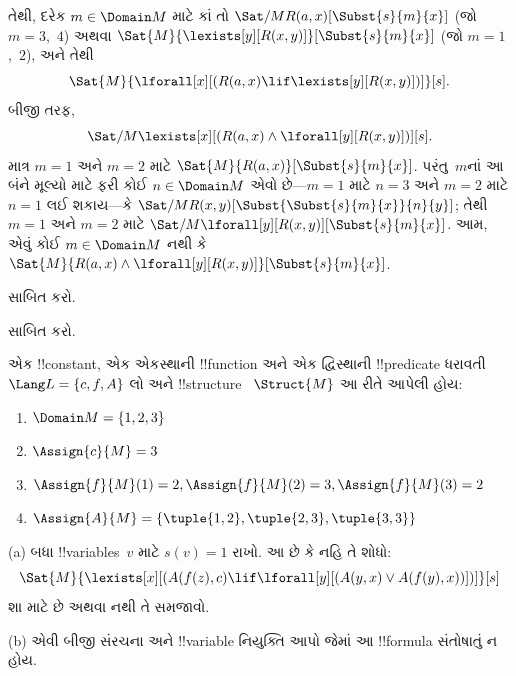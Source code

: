 \documentclass[../../../include/open-logic-section]{subfiles}
\begin{document}
\begin{ex}
તેથી, દરેક $m \in \Domain M$ માટે કાં તો
$\Sat/{M}{R(a,x)}[\Subst{s}{m}{x}]$ (જો $m=3$,~$4$) અથવા
$\Sat{M}{\lexists[y][R(x,y)]}[\Subst{s}{m}{x}]$ (જો $m=1$,~$2$), અને તેથી
\[
\Sat{M}{\lforall[x][(R(a,x) \lif \lexists[y][R(x,y)])]}[s].
\]
બીજી તરફ,
\[
\Sat/{M}{\lexists[x][(R(a,x) \land \lforall[y][R(x,y)])]}[s].
\]
માત્ર $m=1$ અને $m=2$ માટે
$\Sat{M}{R(a,x)}[\Subst{s}{m}{x}]$. પરંતુ~$m$નાં આ બંને મૂલ્યો માટે
ફરી કોઈ $n \in \Domain M$ એવો છે---$m=1$ માટે $n=3$ અને $m=2$ માટે
$n=1$ લઈ શકાય---કે
$\Sat/{M}{R(x,y)}[\Subst{\Subst{s}{m}{x}}{n}{y}]$; તેથી $m=1$ અને
$m=2$ માટે $\Sat/{M}{\lforall[y][R(x,y)]}[\Subst{s}{m}{x}]$. આમ, એવું
કોઈ $m \in \Domain M$ નથી કે
$\Sat{M}{R(a,x) \land \lforall[y][R(x,y)]}[\Subst{s}{m}{x}]$.
\end{ex}


\begin{prob}
   સાબિત કરો.
\end{prob}
\tagendprob


\begin{prob}
   સાબિત કરો.
\end{prob}
\tagendprob

\begin{prob}
એક !!{constant}, એક એકસ્થાની !!{function} અને એક દ્વિસ્થાની
!!{predicate} ધરાવતી $\Lang L=\{c,f,A\}$ લો અને !!{structure}
~$\Struct{M}$ આ રીતે આપેલી હોય:
\begin{enumerate}
\item $\Domain M = \{1, 2, 3\}$
\item $\Assign{c}{M} = 3$
\item $\Assign{f}{M}(1) = 2, \Assign{f}{M}(2) = 3, \Assign{f}{M}(3) = 2$
\item $\Assign{A}{M} = \{\tuple{1, 2}, \tuple{2, 3}, \tuple{3, 3}\}$
\end{enumerate}
(a) બધા !!{variable}s~$v$ માટે $s(v)=1$ રાખો. આ છે કે નહિ તે શોધો:
\[
\Sat{M}{\lexists[x][(A(f(z), c) \lif \lforall[y][(A(y, x) \lor A(f(y),
      x))])]}[s]
\]
શા માટે છે અથવા નથી તે સમજાવો.

(b) એવી બીજી સંરચના અને !!{variable} નિયુક્તિ આપો જેમાં આ !!{formula}
સંતોષાતું ન હોય.
\end{prob}
\end{document}
